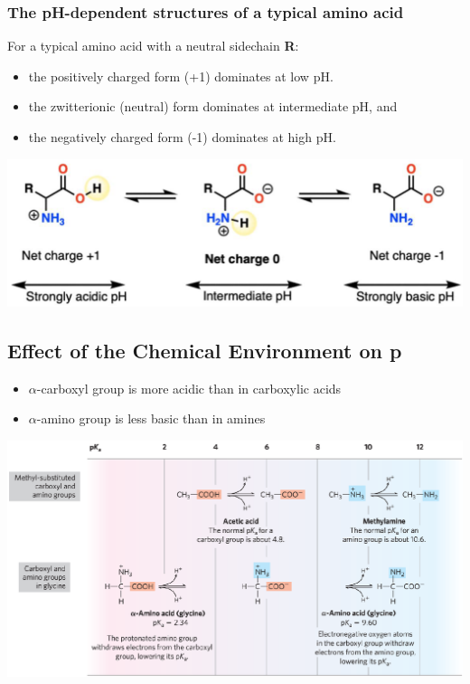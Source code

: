 \documentclass[10pt]{article}
\newcommand{\ka}{\text{$K_\text{a}$}}
\begin{document}
\subsubsection*{The pH-dependent structures of a typical amino acid}
For a typical amino acid with a neutral sidechain \textbf{R}:
\begin{itemize}
    \item the positively charged form (+1) dominates at low pH.
    \item the zwitterionic (neutral) form dominates at intermediate pH, and
    \item the negatively charged form (-1) dominates at high pH.
\end{itemize}
\begin{center}
    \includegraphics[width=\textwidth]{L1_9.png}
\end{center}
\subsection*{Effect of the Chemical Environment on p\ka}
\begin{itemize}
    \item $\alpha$-carboxyl group is more acidic than in carboxylic acids
    \item $\alpha$-amino group is less basic than in amines
\end{itemize}
\begin{center}
    \includegraphics*[width=\textwidth]{L1_10.png}
\end{center}
\end{document}
